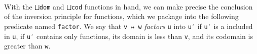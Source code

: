 \begin{fence}
\begin{code}
\AgdaSymbol{\{}\AgdaSymbol{\}}\AgdaSpace{}%
\AgdaSpace{}%
\AgdaSpace{}%
\AgdaSpace{}%
\AgdaSymbol{(}\AgdaSpace{}%
\AgdaSymbol{))}\AgdaSpace{}%
\<%
\\
\>[0]\AgdaSpace{}%
\AgdaSymbol{\{}\AgdaSpace{}%
\AgdaSpace{}%
\AgdaSymbol{\}}\AgdaSpace{}%
\AgdaSpace{}%
\AgdaSymbol{(}\AgdaSpace{}%
\AgdaSymbol{)}\AgdaSpace{}%
\AgdaSymbol{=}\AgdaSpace{}%
\AgdaSpace{}%
\AgdaSpace{}%
\AgdaSymbol{\{}\AgdaSymbol{\}}\AgdaSpace{}%
\AgdaSpace{}%
\AgdaSpace{}%
\AgdaSpace{}%
\AgdaSymbol{(}\AgdaSpace{}%
\AgdaSymbol{))}\AgdaSpace{}%
\<%
\end{code}
\end{fence}

With the \texttt{⨆dom} and \texttt{⨆cod} functions in hand, we can make
precise the conclusion of the inversion principle for functions, which
we package into the following predicate named \texttt{factor}. We say
that \texttt{v\ ↦\ w} \emph{factors} \texttt{u} into \texttt{u′} if
\texttt{u′} is a included in \texttt{u}, if \texttt{u′} contains only
functions, its domain is less than \texttt{v}, and its codomain is
greater than \texttt{w}.

\begin{fence}
\begin{code}%
\>[0]\AgdaSpace{}%
\AgdaSymbol{:}\AgdaSpace{}%
\AgdaSymbol{(}\AgdaSpace{}%
\AgdaSymbol{:}\AgdaSpace{}%
\AgdaSymbol{)}\AgdaSpace{}%
\AgdaSpace{}%
\AgdaSymbol{(}\AgdaSpace{}%
\AgdaSymbol{:}\AgdaSpace{}%
\AgdaSymbol{)}\AgdaSpace{}%
\AgdaSpace{}%
\AgdaSymbol{(}\AgdaSpace{}%
\AgdaSymbol{:}\AgdaSpace{}%
\AgdaSymbol{)}\AgdaSpace{}%
\AgdaSpace{}%
\AgdaSymbol{(}\AgdaSpace{}%
\AgdaSymbol{:}\AgdaSpace{}%
\AgdaSymbol{)}\AgdaSpace{}%
\AgdaSpace{}%
\<%
\\
\>[0]\AgdaSpace{}%
\AgdaSpace{}%
\AgdaSpace{}%
\AgdaSpace{}%
\AgdaSpace{}%
\AgdaSymbol{=}\AgdaSpace{}%
\AgdaSpace{}%
%
\>[31]%
\>[34]\AgdaSpace{}%
\AgdaSpace{}%
%
\>[42]%
\>[45]\AgdaSpace{}%
\AgdaSpace{}%
\AgdaSpace{}%
%
\>[58]%
\>[61]\AgdaSpace{}%
\AgdaSpace{}%
\AgdaSpace{}%
\<%
\end{code}
\end{fence}

